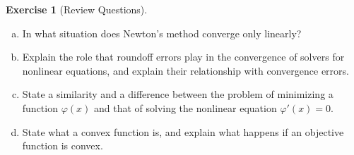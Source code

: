 \documentclass[12pt,a4]{article}
\theoremstyle{definition}
\newtheorem{exercise}{Exercise}
\begin{document}
\begin{exercise}[Review Questions]
\begin{enumerate}[(a)]
		\item In what situation does Newton's method converge only linearly?
		
		\item Explain the role that roundoff errors  play in the convergence of solvers for nonlinear equations, and explain their relationship with convergence errors.
		
		\item State a similarity and a difference between the  problem of minimizing a function $\varphi(x)$ and that of solving the nonlinear equation $\varphi'(x) = 0$. 
		
		\item State what a convex function is, and explain what happens if an objective function is convex. 
	\end{enumerate}
\end{exercise}
\end{document}
